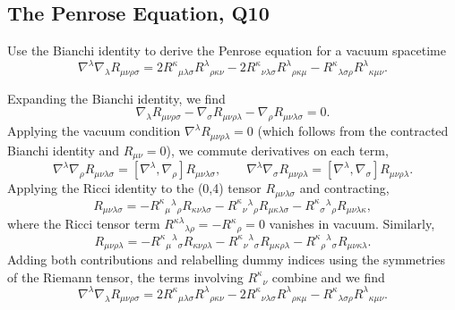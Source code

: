 \subsection{The Penrose Equation, Q10 }

Use the Bianchi identity to derive the Penrose equation for a vacuum spacetime
\begin{equation}
    \nabla^\lambda\nabla_\lambda R_{\mu\nu\rho\sigma} = 2R^\kappa{}_{\mu\lambda\sigma}R^\lambda{}_{\rho\kappa\nu} - 2R^\kappa{}_{\nu\lambda\sigma}R^\lambda{}_{\rho\kappa\mu} - R^\kappa{}_{\lambda\sigma\rho}R^\lambda{}_{\kappa\mu\nu}.
\end{equation}
\begin{solution}
    Expanding the Bianchi identity, we find
    \begin{equation}
        \nabla_\lambda R_{\mu\nu\rho\sigma}-\nabla_\sigma R_{\mu\nu\rho\lambda}- \nabla_\rho R_{\mu\nu\lambda\sigma}=0.
    \end{equation}
    Applying the vacuum condition $\nabla^\lambda R_{\mu\nu\rho\lambda} = 0$ (which follows from the
    contracted Bianchi identity and $R_{\mu\nu}=0$), we commute derivatives on each term,
    \begin{equation}
        \nabla^\lambda\nabla_\rho R_{\mu\nu\lambda\sigma} = [\nabla^\lambda,\nabla_\rho]R_{\mu\nu\lambda\sigma}, \qquad
        \nabla^\lambda\nabla_\sigma R_{\mu\nu\rho\lambda} = [\nabla^\lambda,\nabla_\sigma]R_{\mu\nu\rho\lambda}.
    \end{equation}
    Applying the Ricci identity to the (0,4) tensor $R_{\mu\nu\lambda\sigma}$ and contracting,
    \begin{equation}
        [\nabla^\lambda,\nabla_\rho]R_{\mu\nu\lambda\sigma} = -R^\kappa{}_\mu{}^\lambda{}_\rho R_{\kappa\nu\lambda\sigma} - R^\kappa{}_\nu{}^\lambda{}_\rho R_{\mu\kappa\lambda\sigma} - R^\kappa{}_\sigma{}^\lambda{}_\rho R_{\mu\nu\lambda\kappa},
    \end{equation}
    where the Ricci tensor term $R^{\kappa\lambda}{}_{\lambda\rho} = -R^\kappa{}_\rho = 0$ vanishes in vacuum. Similarly,
    \begin{equation}
        [\nabla^\lambda,\nabla_\sigma]R_{\mu\nu\rho\lambda} = -R^\kappa{}_\mu{}^\lambda{}_\sigma R_{\kappa\nu\rho\lambda} - R^\kappa{}_\nu{}^\lambda{}_\sigma R_{\mu\kappa\rho\lambda} - R^\kappa{}_\rho{}^\lambda{}_\sigma R_{\mu\nu\kappa\lambda}.
    \end{equation}
    Adding both contributions and relabelling dummy indices using the symmetries of
    the Riemann tensor, the terms involving $R^\kappa{}_\nu$ combine and we find
    \begin{equation}
        \nabla^\lambda\nabla_\lambda R_{\mu\nu\rho\sigma} = 2R^\kappa{}_{\mu\lambda\sigma}R^\lambda{}_{\rho\kappa\nu} - 2R^\kappa{}_{\nu\lambda\sigma}R^\lambda{}_{\rho\kappa\mu} - R^\kappa{}_{\lambda\sigma\rho}R^\lambda{}_{\kappa\mu\nu}.
    \end{equation}
\end{solution}

